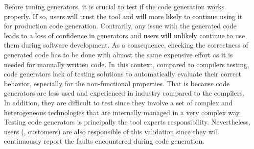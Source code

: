 
Before tuning generators, it is crucial to test if the code generation works properly. If so, users will trust the tool and will more likely to continue using it for production code generation. Contrarily, any issue with the generated code leads to a loss of confidence in generators and users will unlikely continue to use them during software development. As a consequence, checking the correctness of generated code has to be done with almost the same expensive effort as it is needed for manually written code.
In this context, compared to compilers testing\cite{yang2011finding,le2014compiler}, code generators lack of testing solutions to automatically evaluate their correct behavior, especially for the non-functional properties.
That is because code generators are less used and experienced in industry compared to the compilers. In addition, they are difficult to test since they involve a set of complex and heterogeneous technologies that are internally managed in a very complex way\cite{guana2015developers,guana2014chaintracker}.
Testing code generators is principally the tool experts responsibility. Nevertheless, users (\eg, customers) are also responsible of this validation since they will continuously report the faults encountered during code generation. 
